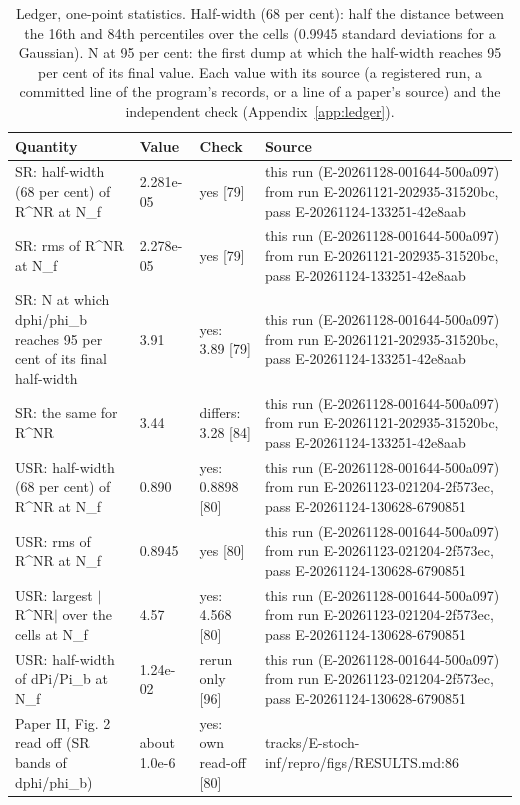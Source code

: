 \begin{table}
\caption{Ledger, one-point statistics. Half-width (68 per cent): half the distance between the 16th and 84th percentiles over the cells (0.9945 standard deviations for a Gaussian). N at 95 per cent: the first dump at which the half-width reaches 95 per cent of its final value. Each value with its source (a registered run, a committed line of the program's records, or a line of a paper's source) and the independent check (Appendix~\ref{app:ledger}).}
\label{tab:ledgeronepointstatistics}
\footnotesize
\begin{tabular}{p{}p{}p{}p{}}
\toprule
Quantity & Value & Check & Source \\
\midrule
SR: half-width (68 per cent) of R\^{}NR at N\_f & 2.281e-05 & yes [79] & this run (E-20261128-001644-500a097) from run E-20261121-202935-31520bc, pass E-20261124-133251-42e8aab \\
SR: rms of R\^{}NR at N\_f & 2.278e-05 & yes [79] & this run (E-20261128-001644-500a097) from run E-20261121-202935-31520bc, pass E-20261124-133251-42e8aab \\
SR: N at which dphi/\allowbreak{}phi\_b reaches 95 per cent of its final half-width & 3.91 & yes: 3.89 [79] & this run (E-20261128-001644-500a097) from run E-20261121-202935-31520bc, pass E-20261124-133251-42e8aab \\
SR: the same for R\^{}NR & 3.44 & differs: 3.28 [84] & this run (E-20261128-001644-500a097) from run E-20261121-202935-31520bc, pass E-20261124-133251-42e8aab \\
USR: half-width (68 per cent) of R\^{}NR at N\_f & 0.890 & yes: 0.8898 [80] & this run (E-20261128-001644-500a097) from run E-20261123-021204-2f573ec, pass E-20261124-130628-6790851 \\
USR: rms of R\^{}NR at N\_f & 0.8945 & yes [80] & this run (E-20261128-001644-500a097) from run E-20261123-021204-2f573ec, pass E-20261124-130628-6790851 \\
USR: largest $|$R\^{}NR$|$ over the cells at N\_f & 4.57 & yes: 4.568 [80] & this run (E-20261128-001644-500a097) from run E-20261123-021204-2f573ec, pass E-20261124-130628-6790851 \\
USR: half-width of dPi/\allowbreak{}Pi\_b at N\_f & 1.24e-02 & rerun only [96] & this run (E-20261128-001644-500a097) from run E-20261123-021204-2f573ec, pass E-20261124-130628-6790851 \\
Paper II, Fig. 2 read off (SR bands of dphi/\allowbreak{}phi\_b) & about 1.0e-6 & yes: own read-off [80] & tracks/\allowbreak{}E-stoch-inf/\allowbreak{}repro/\allowbreak{}figs/\allowbreak{}RESULTS.md:86 \\

\end{tabular}
\end{table}
